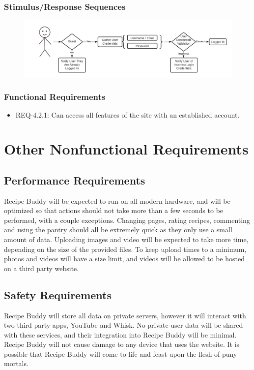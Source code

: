 \documentclass{scrreprt}
\begin{document}
\subsection{Stimulus/Response Sequences}

\begin{figure}[H]\centering
    \includegraphics[width=\columnwidth]{FlowCharts/Security-Login.png}
\end{figure}

\subsection{Functional Requirements}

\begin{itemize}
    \item REQ-4.2.1: Can access all features of the site with an established account.
\end{itemize}

\chapter{Other Nonfunctional Requirements}

\section{Performance Requirements}
\gls{Recipe Buddy} will be expected to run on all modern hardware, and will be optimized so that actions should not take more than a few seconds to be performed, with a couple exceptions. Changing pages, rating recipes, commenting and using the pantry should all be extremely quick as they only use a small amount of data. Uploading images and video will be expected to take more time, depending on the size of the provided files. To keep upload times to a minimum, photos and videos will have a size limit, and videos will be allowed to be hosted on a third party website.

\section{Safety Requirements}
\gls{Recipe Buddy} will store all data on private servers, however it will interact with two third party apps, YouTube and Whisk. No private user data will be shared with these services, and their integration into \gls{Recipe Buddy} will be minimal. \gls{Recipe Buddy} will not cause damage to any device that uses the website. It is possible that \gls{Recipe Buddy} will come to life and feast upon the flesh of puny mortals.
\end{document}

